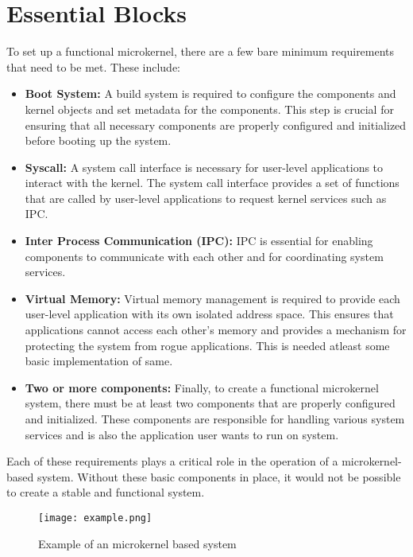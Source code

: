 \documentclass[
	a4paper, %
	11pt, %
	unnumberedsections, %
	twoside, %
]{LTJournalArticle}
\begin{document}
\section{Essential Blocks}
To set up a functional microkernel, there are a few bare minimum requirements that need to be met. These include:
\begin{itemize}
	\item \textbf{Boot System:} A build system is required to configure the components and kernel objects and set metadata for the components. This step is crucial for ensuring that all necessary components are properly configured and initialized before booting up the system.
	
	\item \textbf{Syscall:} A system call interface is necessary for user-level applications to interact with the kernel. The system call interface provides a set of functions that are called by user-level applications to request kernel services such as IPC.
	
	\item \textbf{Inter Process Communication (IPC):} IPC is essential for enabling components to communicate with each other and for coordinating system services.
	
	\item \textbf{Virtual Memory:} Virtual memory management is required to provide each user-level application with its own isolated address space. This ensures that applications cannot access each other's memory and provides a mechanism for protecting the system from rogue applications. This is needed atleast some basic implementation of same.
	
	\item \textbf{Two or more components:} Finally, to create a functional microkernel system, there must be at least two components that are properly configured and initialized. These components are responsible for handling various system services and is also the application user wants to run on system.

\end{itemize}
	
Each of these requirements plays a critical role in the operation of a microkernel-based system. Without these basic components in place, it would not be possible to create a stable and functional system.

\begin{figure*} %
	\texttt{[image: example.png]}
	\caption{Example of an microkernel based system}
	\label{fig:example}
\end{figure*}
\end{document}
